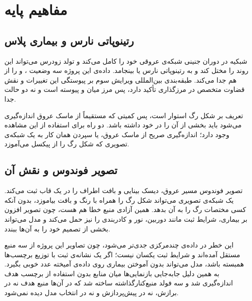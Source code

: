 \clearpage
\section{مفاهیم پایه}
\subsection{رتینوپاتی نارس و بیماری پلاس}

شبکیه در دوران جنینی شبکه‌ی عروقی خود را کامل می‌کند و تولد زودرس می‌تواند این روند را مختل کند و به رتینوپاتی نارس یا  بینجامد. داده‌ی این پروژه سه وضعیت ،  و  را از هم جدا می‌کند. طبقه‌بندی بین‌المللی ویرایش سوم  بر پیوستگی این تغییرات و نقش قضاوت متخصص در مرزگذاری تأکید دارد، پس مرز میان  و  پیوسته است و نه دو حالت جدا.

تعریف  بر شکل رگ استوار است، پس کمیتی که مستقیماً از ماسک عروق اندازه‌گیری می‌شود باید بخشی از آن را در خود داشته باشد. دو راه برای استفاده از این مشاهده وجود دارد؛ اندازه‌گیری صریح از ماسک عروق، یا سپردن همان کار به یک شبکه‌ی تصویری که شکل رگ را از پیکسل می‌آموزد.

\subsection{تصویر فوندوس و نقش آن}

تصویر فوندوس مسیر عروق، دیسک بینایی و بافت اطراف را در یک قاب ثبت می‌کند. یک شبکه‌ی تصویری می‌تواند شکل رگ را همراه با رنگ و بافت بیاموزد، بدون آنکه کسی مختصات رگ را به آن بدهد. همین آزادی منبع خطا هم هست، چون تصویر افزون بر بیماری، شرایط ثبت مانند دوربین، نور و کادربندی را نیز حمل می‌کند و مدل می‌تواند بخشی از تصمیم خود را به آن‌ها ببندد.

این خطر در داده‌ی چندمرکزی جدی‌تر می‌شود، چون تصاویر این پروژه از سه منبع مستقل آمده‌اند و شرایط ثبت یکسان نیست؛ اگر یک نشانه‌ی ثبت با توزیع برچسب‌ها همبسته باشد، مدل می‌تواند بدون آموختن بیماری روی داده‌ی آمیخته عدد خوبی بگیرد. به همین دلیل جابه‌جایی بازنمایی‌ها میان منابع بدون استفاده از برچسب هدف اندازه‌گیری شد و سه فولد منبع‌کنارگذاشته ساخته شد که در آن‌ها منبع هدف نه در برازش، نه در پیش‌پردازش و نه در انتخاب مدل دیده نمی‌شود.

